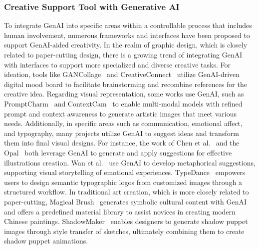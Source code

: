 
\subsubsection{Creative Support Tool with Generative AI}
To integrate GenAI into specific areas within a controllable process that includes human involvement, numerous frameworks and interfaces have been proposed to support GenAI-aided creativity.
In the realm of graphic design, which is closely related to paper-cutting design, there is a growing trend of integrating GenAI with interfaces to support more specialized and diverse creative tasks. For ideation, tools like GANCollage~\cite{Wan:2023:gancollage} and CreativeConnect~\cite{Choi:2024:creativeconnect} utilize GenAI-driven digital mood board to facilitate brainstorming and recombine references for the creative idea.
Regarding visual representation, some works use GenAI, such as PromptCharm~\cite{Wang:2024:promptcharm} and ContextCam~\cite{Fan:2024:contextcam} to enable multi-modal models with refined prompt and context awareness to generate artistic images that meet various needs. 
Additionally, in specific areas such as communication, emotional affect, and typography, many projects utilize GenAI to suggest ideas and transform them into final visual designs. For instance, the work of Chen et al.~\cite{Chen:2024:dataanalogy} and the Opal~\cite{Liu:2022:opal} both leverage GenAI to generate and apply suggestions for effective illustrations creation. Wan et al.~\cite{Wan:2024:metamorpheus} use GenAI to develop metaphorical suggestions, supporting visual storytelling of emotional experiences. TypeDance~\cite{Xiao:2024:typedance} empowers users to design semantic typographic logos from customized images through a structured workflow.
In traditional art creation, which is more closely related to paper-cutting, Magical Brush~\cite{Xu:2023:magicalbrush} generates symbolic cultural content with GenAI and offers a predefined material library to assist novices in creating modern Chinese paintings. ShadowMaker~\cite{Yao:2024:shadowmaker} enables designers to generate shadow puppet images through style transfer of sketches, ultimately combining them to create shadow puppet animations.
